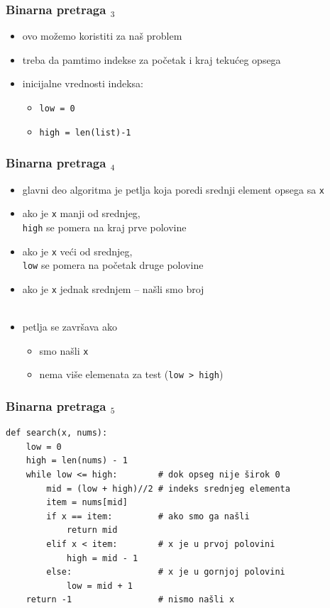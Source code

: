 \documentclass[utf8,compress]{beamer}
\begin{document}
\begin{frame}[fragile]
  \frametitle{Binarna pretraga $_3$}
  \begin{itemize}
    \item ovo možemo koristiti za naš problem
    \item treba da pamtimo indekse za početak i kraj tekućeg opsega
    \item inicijalne vrednosti indeksa:
    \begin{itemize}
      \item \texttt{low = 0}
      \item \texttt{high = len(list)-1}
    \end{itemize}
  \end{itemize}
\end{frame}

\begin{frame}[fragile]
  \frametitle{Binarna pretraga $_4$}
  \begin{itemize}
    \item glavni deo algoritma je petlja koja poredi srednji element opsega sa \texttt{x}
    \item ako je \texttt{x} manji od srednjeg, \\ \texttt{high} se pomera na kraj prve polovine
    \item ako je \texttt{x} veći od srednjeg, \\ \texttt{low} se pomera na početak druge polovine
    \item ako je \texttt{x} jednak srednjem -- našli smo broj \\ \ \\
    \item petlja se završava ako
    \begin{itemize}
      \item smo našli \texttt{x}
      \item nema više elemenata za test (\texttt{low > high})
    \end{itemize}
  \end{itemize}
\end{frame}

\begin{frame}[fragile]
  \frametitle{Binarna pretraga $_5$}
\begin{verbatim}
def search(x, nums):
    low = 0
    high = len(nums) - 1
    while low <= high:        # dok opseg nije širok 0
        mid = (low + high)//2 # indeks srednjeg elementa
        item = nums[mid]
        if x == item:         # ako smo ga našli
            return mid
        elif x < item:        # x je u prvoj polovini
            high = mid - 1
        else:                 # x je u gornjoj polovini
            low = mid + 1
    return -1                 # nismo našli x
\end{verbatim}
\end{frame}
\end{document}
